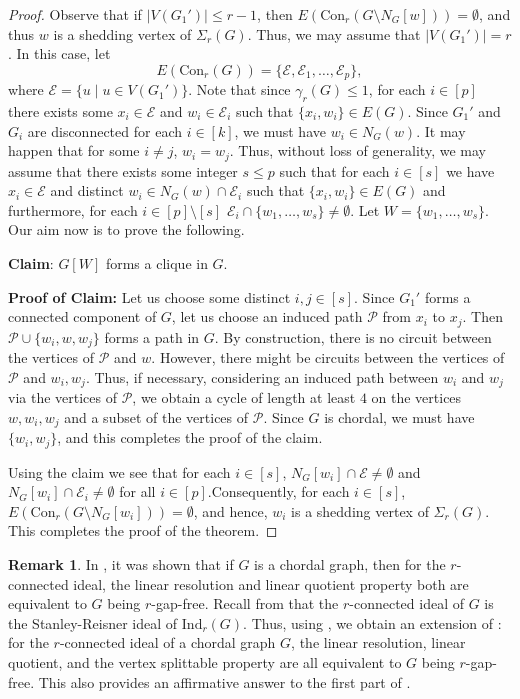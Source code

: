 \documentclass[12pt,reqno]{amsart}
\theoremstyle{definition}
\newtheorem{remark}[proposition]{Remark}
\newcommand{\Con}{{\mathrm{Con}}}
\def\E{\mathcal{E}}
\def\Indr{\mathrm{Ind}_r(G)}
\begin{document}
\begin{proof}
		Observe that if $|V(G_1')|\le r-1$, then $E(\Con_r\left(G \setminus N_G[w]\right)) = \emptyset$, and thus $w$ is a shedding vertex of $\Sigma_{r}(G)$. Thus, we may assume that $|V(G_1')|=r$. In this case, let \[
        E(\Con_r(G))=\{\E,\E_1,\ldots,\E_p\},
        \]where $\E=\{u\mid u\in V(G_1')\}$. %
		Note that since $\gamma_r(G)\le 1$, for each $i\in [p]$ there exists some $x_i\in\E$ and $w_i\in \E_i$ such that $\{x_i,w_i\}\in E(G)$. Since $G_1'$ and $G_i$ are disconnected for each $i\in [k]$, we must have $w_i\in N_G(w)$. It may happen that for some $i\neq j$, $w_i=w_j$. Thus, without loss of generality, we may assume that there exists some integer $s\le p$ such that for each $i\in [s]$ we have $x_i\in \E$ and distinct $w_i\in N_G(w)\cap \E_i$ such that $\{x_i,w_i\}\in E(G)$ and furthermore, for each $i\in [p]\setminus[s]$ $\E_i\cap\{w_1,\ldots,w_s\}\neq\emptyset$. Let $W=\{w_1,\ldots,w_s\}$. Our aim now is to prove the following.
		
		\medskip
		\noindent
		{\bf Claim}: $G[W]$ forms a clique in $G$.
		
		\medskip
		\noindent
		{\bf Proof of Claim:} Let us choose some distinct $i,j\in [s]$. Since $G_1'$ forms a connected component of $G$, let us choose an induced path $\mathcal P$ from $x_i$ to $x_j$. Then $\mathcal P\cup\{w_i,w,w_j\}$ forms a path in $G$. By construction, there is no circuit between the vertices of $\mathcal P$ and $w$. However, there might be circuits between the vertices of $\mathcal P$ and $w_i,w_j$. Thus, if necessary, considering an induced path between $w_i$ and $w_j$ via the vertices of $\mathcal P$, we obtain a cycle of length at least $4$ on the vertices $w,w_i,w_j$ and a subset of the vertices of $\mathcal P$. Since $G$ is chordal, we must have $\{w_i,w_j\}$, and this completes the proof of the claim. 
		
		Using the claim we see that for each $i\in [s]$, $N_G[w_i]\cap\E\neq\emptyset$ and $N_G[w_i]\cap \E_i\neq\emptyset$ for all $i\in [p]$.Consequently, for each $i\in[s]$, $E(\Con_r(G \setminus N_G[w_i])) = \emptyset$, and hence, $w_i$ is a shedding vertex of $\Sigma_r(G)$. This completes the proof of the theorem.
	\end{proof}
	
	\begin{remark}
		In \cite{LQCG}, it was shown that if $G$ is a chordal graph, then for the $r$-connected ideal, the linear resolution and linear quotient property both are equivalent to $G$ being $r$-gap-free. Recall from  that the $r$-connected ideal of $G$ is the Stanley-Reisner ideal of $\Indr$. Thus, using \cite[Theorem 2.3]{MoradiAhang2016}, we obtain an extension of \cite[Theorem 5.1]{LQCG}: for the $r$-connected ideal of a chordal graph $G$, the linear resolution, linear quotient, and the vertex splittable property are all equivalent to $G$ being $r$-gap-free. This also provides an affirmative answer to the first part of \cite[Question 7.5]{LQCG}.
	\end{remark}
	
\end{document}
